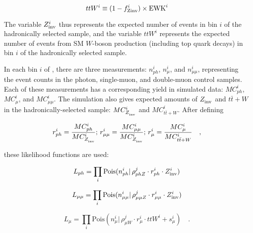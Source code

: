 \begin{equation}
  ttW^{i} \equiv (1-\fZinv{i})\times \ewk^i
  \label{eq:ttWEwk}
\end{equation}

The variable $\zInv{i}$ thus represents the expected number of \znunu
events in \HT bin $i$ of the hadronically selected sample, and the
variable $ttW^i$ represents the expected number of events from SM
$W$-boson production (including top quark decays) in \HT bin $i$ of
the hadronically selected sample.

In each bin $i$ of \HT, there are three measurements: $n_{ph}^i$,
$n_{\mu}^i$, and $n_{\mu\mu}^i$, representing the event counts in the
photon, single-muon, and double-muon control samples.  Each of these
measurements has a corresponding yield in simulated data: $MC_{ph}^i$,
$MC_{\mu}^i$, and $MC_{\mu\mu}^i$.  The simulation also gives expected
amounts of $\zInv{}$ and $t\bar{t}+W$ in the hadronically-selected
sample: $MC_{\zInv{}}^i$ and $MC_{t\bar{t}+W}^i$.  After defining

\begin{equation}
r_{ph}^i = \frac{MC_{ph}^i}{MC_{\zInv{}}^i};\, r_{\mu\mu}^i =
\frac{MC_{\mu\mu}^i}{MC_{\zInv{}}^i};\, r_{\mu}^i =
\frac{MC_{\mu}^i}{MC_{t\bar{t}+W}^i}\quad ,
\end{equation}

these likelihood functions are used:

\begin{equation}
\label{eq:photonLikelihood}
L_{ph}= \prod_i \mathrm{Pois}(n_{ph}^i |\, \rho_{phZ}^j \cdot
r_{ph}^{i} \cdot \zInv{i})
\end{equation}

\begin{equation}
\label{eq:mumuLikelihood}
L_{\mu\mu}=\prod_i \mathrm{Pois}(n_{\mu\mu}^i |\, \rho_{\mu\mu Z}^j
\cdot r_{\mu\mu}^{i} \cdot \zInv{i})
\end{equation}

\begin{equation}
\label{eq:muonLikelihood}
L_{\mu}=\prod_i \mathrm{Pois}(n_{\mu}^i |\, \rho_{\mu W}^j \cdot
r_{\mu}^{i} \cdot ttW^{i} + s_{\mu}^i)\quad .
\end{equation}

